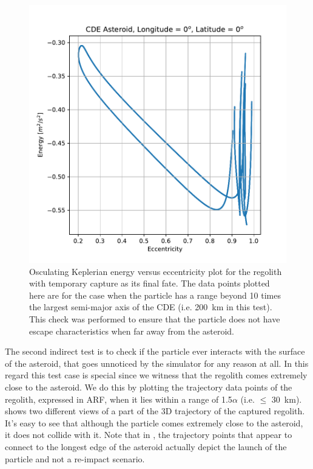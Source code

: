 \begin{figure}[htb]
\centering
\captionsetup{justification=centering}
\includegraphics[width=\textwidth, height=0.4\textheight, keepaspectratio=true]{Images/capture_vv_energy_eccentricity_10AlphaUpwards.pdf}
\caption{Osculating Keplerian energy versus eccentricity plot for the regolith with temporary capture as its final fate. The data points plotted here are for the case when the particle has a range beyond 10 times the largest semi-major axis of the \gls{CDE} (i.e. \SI{200}{\kilo \metre} in this test). This check was performed to ensure that the particle does not have escape characteristics when far away from the asteroid.}
\label{fig:capture_vv_energy_eccentricity}
\end{figure}
\FloatBarrier
The second indirect test is to check if the particle ever interacts with the surface of the asteroid, that goes unnoticed by the simulator for any reason at all. In this regard this test case is special since we witness that the regolith comes extremely close to the asteroid. We do this by plotting the trajectory data points of the regolith, expressed in \gls{ARF}, when it lies within a range of 1.5$\alpha$ (i.e. $\leq$ \SI{30}{\kilo \metre}).  shows two different views of a part of the 3D trajectory of the captured regolith. It's easy to see that although the particle comes extremely close to the asteroid, it does not collide with it. Note that in , the trajectory points that appear to connect to the longest edge of the asteroid actually depict the launch of the particle and not a re-impact scenario.
